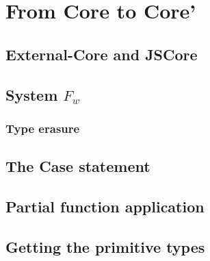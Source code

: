 

\chapter{From Core to Core'}


\section{External-Core and JSCore}


\section{System $F_w$}

\subsection{Type erasure}

\section{The Case statement}


\section{Partial function application}


\section{Getting the primitive types}



